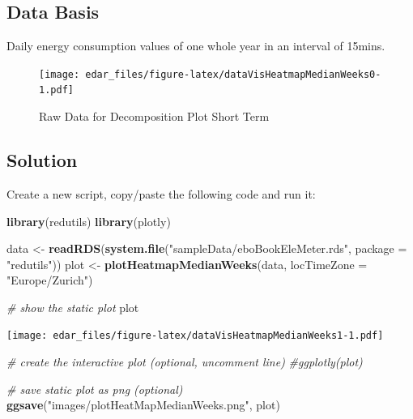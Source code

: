 \documentclass[
]{book}
\newenvironment{Shaded}{\begin{snugshade}}{\end{snugshade}}
\newcommand{\CommentTok}[1]{\textcolor[rgb]{0.56,0.35,0.01}{\textit{#1}}}
\newcommand{\DataTypeTok}[1]{\textcolor[rgb]{0.13,0.29,0.53}{#1}}
\newcommand{\KeywordTok}[1]{\textcolor[rgb]{0.13,0.29,0.53}{\textbf{#1}}}
\newcommand{\NormalTok}[1]{#1}
\newcommand{\StringTok}[1]{\textcolor[rgb]{0.31,0.60,0.02}{#1}}
\let\oldShaded\Shaded
\let\endoldShaded\endShaded
\renewenvironment{Shaded}{\footnotesize\oldShaded}{\endoldShaded}
\begin{document}
\hypertarget{data-basis-7}{%
\subsection{Data Basis}\label{data-basis-7}}

Daily energy consumption values of one whole year in an interval of 15mins.

\begin{figure}
\centering
\texttt{[image: edar\_files/figure-latex/dataVisHeatmapMedianWeeks0-1.pdf]}
\caption{\label{fig:dataVisHeatmapMedianWeeks0}Raw Data for Decomposition Plot Short Term}
\end{figure}

\hypertarget{solution-7}{%
\subsection{Solution}\label{solution-7}}

Create a new script, copy/paste the following code and run it:

\begin{Shaded}
\begin{Highlighting}[]
\KeywordTok{library}\NormalTok{(redutils)}
\KeywordTok{library}\NormalTok{(plotly)}

\NormalTok{data <-}\StringTok{ }\KeywordTok{readRDS}\NormalTok{(}\KeywordTok{system.file}\NormalTok{(}\StringTok{"sampleData/eboBookEleMeter.rds"}\NormalTok{, }\DataTypeTok{package =} \StringTok{"redutils"}\NormalTok{))}
\NormalTok{plot <-}\StringTok{ }\KeywordTok{plotHeatmapMedianWeeks}\NormalTok{(data, }\DataTypeTok{locTimeZone =} \StringTok{"Europe/Zurich"}\NormalTok{)}

\CommentTok{# show the static plot}
\NormalTok{plot}
\end{Highlighting}
\end{Shaded}

\texttt{[image: edar\_files/figure-latex/dataVisHeatmapMedianWeeks1-1.pdf]}

\begin{Shaded}
\begin{Highlighting}[]
\CommentTok{# create the interactive plot (optional, uncomment line)}
\CommentTok{#ggplotly(plot)}
\end{Highlighting}
\end{Shaded}

\begin{Shaded}
\begin{Highlighting}[]
\CommentTok{# save static plot as png (optional)}
\KeywordTok{ggsave}\NormalTok{(}\StringTok{"images/plotHeatMapMedianWeeks.png"}\NormalTok{, plot)}
\end{Highlighting}
\end{Shaded}
\end{document}
